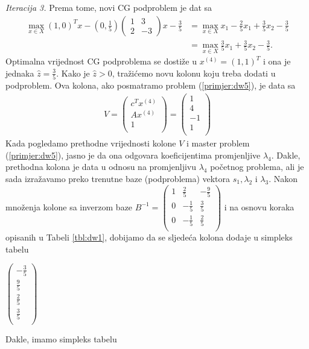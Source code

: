 \documentclass[a4paper, utf8, 11pt, colorlinks]{book}
\theoremstyle{definition}
\begin{document}
  
  \vspace{5mm}
   \emph{Iteracija 3.} Prema tome, novi CG podproblem je dat sa 
  \begin{align*}
        \max_{x \in X} (1, 0)^T x - (0, \frac{1}{5})\left(\begin{array}{cc}
       	1 & 3 \\
       	2 & -3
       \end{array}\right)  x   - \frac{3}{5} &= \max_{x \in X}x_1  - \frac{2}{5}x_1 + \frac{3}{5}x_2 - \frac{3}{5} \\
       &= \max_{x \in X} \frac{3}{5}x_1 + \frac{3}{5}x_2 - \frac{3}{5}.
  \end{align*} 
Optimalna vrijednost CG podproblema se dostiže u $x^{(4)} = (1, 1)^T$ i ona je jednaka $\hat{z}=\frac{3}{5}$. Kako je $\hat{z}>0$, tražićemo novu kolonu koju treba dodati u podproblem. Ova kolona, ako posmatramo problem (\ref{primjer:dw5}), je   data sa 
\begin{align}
	V =   \begin{pmatrix}
		c^T x^{(4)}\\
		A x^{(4)}  \\
		1     \\
	\end{pmatrix} = \begin{pmatrix}
		1 \\
		4  \\
		-1  \\
		1\\  
	\end{pmatrix}
\end{align}
Kada pogledamo prethodne vrijednosti kolone $V$ i master problem (\ref{primjer:dw5}), jasno je da ona odgovara koeficijentima promjenljive $\lambda_4$. Dakle, prethodna kolona je data u odnosu na promjenljivu $\lambda_4$ početnog problema, ali je sada izražavamo preko trenutne baze (podproblema) vektora $s_1, \lambda_2$ i $\lambda_3$.  Nakon množenja kolone sa inverzom baze 
$B^{-1}= 
\begin{pmatrix}
	 1 &  \frac{2}{5}   & -\frac{9}{5} \\
	 0 &  -\frac{1}{5}  & \frac{3}{5}  \\
	 0 &  -\frac{1}{5}  & \frac{2}{5}  \\ 
\end{pmatrix} $ i na osnovu koraka opisanih u Tabeli \ref{tbl:dw1}, dobijamo da se sljedeća kolona dodaje u simpleks tabelu

\begin{center}
	
	$\begin{pmatrix}
		-\frac{3}{5}            \\
		\frac{9}{5}     \\
		 \frac{2}{5}       \\
		\frac{3}{5}    \\
	\end{pmatrix}$
\end{center}
Dakle, imamo simpleks tabelu 
\end{document}
